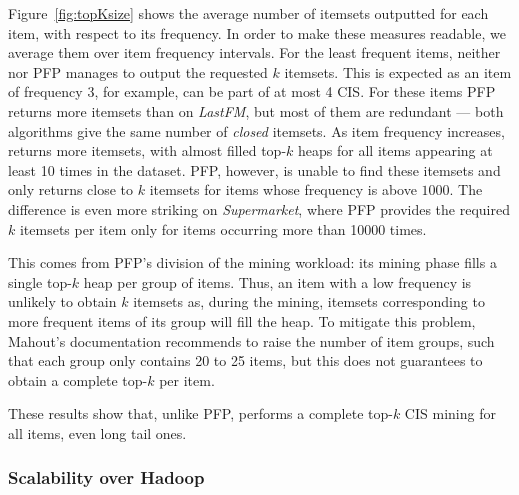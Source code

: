 Figure~\ref{fig:topKsize} shows the average number of itemsets outputted for each item,
with respect to its frequency.
In order to make these measures readable, we average them over item frequency intervals.
For the least frequent items, neither \toppi nor PFP manages to output the requested $k$ itemsets.
This is expected as an item of frequency 3, for example, can be part of at most 4 CIS.
For these items PFP returns more itemsets than \toppi on \textit{LastFM},
but most of them are redundant
--- both algorithms give the same number of {\em closed} itemsets.
As item frequency increases, \toppi returns more itemsets,
with almost  filled top-$k$ heaps for all items appearing at least 10 times in the dataset.
PFP, however, is unable to find these itemsets
and only returns close to $k$ itemsets for items whose frequency is above $\num{1000}$.
The difference is even more striking on \textit{Supermarket},
where PFP provides the required $k$ itemsets per item only for items occurring more than \num{10000} times.

This comes from PFP's division of the mining workload:
its mining phase fills a single top-$k$ heap per group of items.
Thus, an item with a low frequency is unlikely to obtain $k$ itemsets as, during the mining,
itemsets corresponding to more frequent items of its group will fill the heap.
To mitigate this problem, Mahout's documentation recommends to raise the number of item groups,
such that each group only contains 20 to 25 items,
but this does not guarantees to obtain a complete top-$k$ per item.

These results show that, unlike PFP, \toppi performs a complete top-$k$ CIS mining for all items,
even long tail ones.%




\subsubsection{Scalability over Hadoop}

